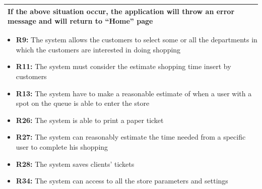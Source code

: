 \documentclass{article}
\begin{document}
\begin{center}
\begin{adjustwidth}{-2.8cm}{}
\begin{tabular}[h!]{|m{7.5em}|m{36em}|}
							If the above situation occur, the application will throw an error message and will return to “Home” page \\
							\hline
							
						\end{tabular}
					

				
					\end{adjustwidth}
				
														\begin{itemize}
					\bigskip
					\bigskip
					\bigskip
					\bigskip
					{\bfseries Required functional requirements: }
					
					
					\item {\bfseries R9: } The system allows the customers to select some or all the departments in which the customers are interested in doing shopping
					\item {\bfseries R11: } The system must consider the estimate shopping time insert
					by customers
					\item {\bfseries R13: } The system have to make a reasonable estimate of when a user with a spot on the queue is able to enter the store
					\item {\bfseries R26: } The system is able to print a paper ticket
					\item {\bfseries R27: } The system can reasonably estimate the time needed from a specific user to complete his shopping
					\item {\bfseries R28: } The system saves clients' tickets
					\item {\bfseries R34: } The system can access to all the store parameters and settings
					
					
					

\end{itemize}
\end{center}
\end{document}
